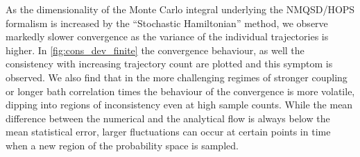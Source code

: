 As the dimensionality of the Monte Carlo integral underlying the
NMQSD/HOPS formalism is increased by the ``Stochastic Hamiltonian''
method, we observe markedly slower convergence as the variance of the
individual trajectories is higher. In \cref{fig:cons_dev_finite} the
convergence behaviour, as well the consistency with increasing
trajectory count are plotted and this symptom is observed. We also
find that in the more challenging regimes of stronger coupling or
longer bath correlation times the behaviour of the convergence is more
volatile, dipping into regions of inconsistency even at high sample
counts. While the mean difference between the numerical and the
analytical flow is always below the mean statistical error, larger
fluctuations can occur at certain points in time when a new region of
the probability space is sampled.

